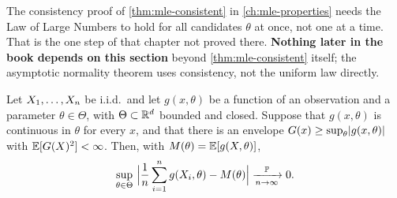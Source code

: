 The consistency proof of \cref{thm:mle-consistent} in \cref{ch:mle-properties} needs the Law of Large Numbers to hold for all candidates $\theta$ at once, not one at a time.
That is the one step of that chapter not proved there.
\textbf{Nothing later in the book depends on this section} beyond \cref{thm:mle-consistent} itself; the asymptotic normality theorem uses consistency, not the uniform law directly.


\begin{theorem}
\label{thm:ulln}
Let $X_1, \ldots, X_n$ be i.i.d.\ and let $g(x, \theta)$ be a function of an observation and a parameter $\theta \in \Theta$, with $\Theta \subset \mathbb{R}^d$ bounded and closed.
Suppose that $g(x, \theta)$ is continuous in $\theta$ for every $x$, and that there is an envelope $G(x) \geq \sup_{\theta}\lvert g(x, \theta)\rvert$ with $\operatorname*{\mathbb{E}}[G(X)^2] < \infty$.
Then, with $M(\theta) = \operatorname*{\mathbb{E}}[g(X, \theta)]$,
\[
\sup_{\theta \in \Theta}\,\Big|\frac1n\sum_{i=1}^n g(X_i, \theta) - M(\theta)\Big| \xrightarrow [n \to \infty ]{\mathbb{P}} 0.
\]
\end{theorem}

